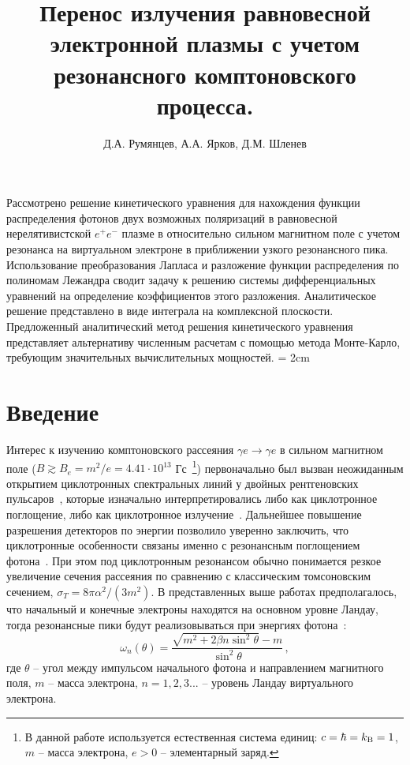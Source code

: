 \documentclass[14pt, russian]{article}
\begin{document}

\title{Перенос излучения равновесной электронной плазмы с учетом резонансного комптоновского процесса.}
\author{Д.А. Румянцев, А.А. Ярков, Д.М. Шленев}
\date{}
\maketitle

Рассмотрено решение кинетического уравнения для нахождения функции распределения фотонов двух возможных поляризаций в равновесной нерелятивистской $e^+e^-$ плазме в относительно сильном магнитном поле с учетом резонанса на виртуальном электроне в приближении узкого резонансного пика. Использование преобразования Лапласа и разложение функции распределения по полиномам Лежандра сводит задачу к решению системы дифференциальных уравнений на определение коэффициентов этого разложения. Аналитическое решение представлено в виде интеграла на комплексной плоскости. Предложенный аналитический метод решения кинетического уравнения представляет альтернативу численным расчетам с помощью метода Монте-Карло, требующим значительных вычислительных мощностей.
\marginparwidth = 2cm %
\section{Введение}

Интерес к изучению комптоновского рассеяния $\gamma e \to \gamma e$ в 
сильном магнитном поле ($B\gtrsim B_e = m^2 / e= 4.41\cdot 10^{13}$ Гс~\footnote{В данной работе используется естественная система единиц: $c = \hbar = k_{\rm{B}} = 1$, $m$ -- масса электрона, $e > 0$ -- элементарный заряд.}) первоначально был вызван неожиданным открытием циклотронных 
спектральных линий у двойных рентгеновских 
пульсаров~\cite{Truemper1978,Makishima1990,Grove1995}, которые изначально 
интерпретировались либо как циклотронное поглощение, либо как циклотронное 
излучение~\cite{Truemper1978}. Дальнейшее повышение разрешения детекторов по 
энергии позволило уверенно заключить, что циклотронные особенности связаны 
именно с резонансным поглощением фотона~\cite{Mihara:1990}.
При этом под циклотронным резонансом обычно понимается 
резкое увеличение сечения рассеяния по сравнению с классическим томсоновским 
сечением, $\sigma_T = 8 \pi \alpha^2 /(3 m^2)$.
В представленных выше работах предполагалось, что начальный и конечные электроны находятся 
на основном уровне Ландау, тогда резонансные пики будут реализовываться при энергиях фотона~\cite{Daugherty:1986}:
\begin{equation}\label{eq:whn}
	\omega_n(\theta)= \frac{\sqrt{m^2+2 \beta n \sin^2\theta} - 
		m}{\sin^2\theta}\, ,
\end{equation}
где $\theta$ -- угол между импульсом начального фотона и направлением 
магнитного поля, $m$ -- масса электрона, $n=1,2,3...$ -- уровень Ландау виртуального электрона. 
\end{document}
